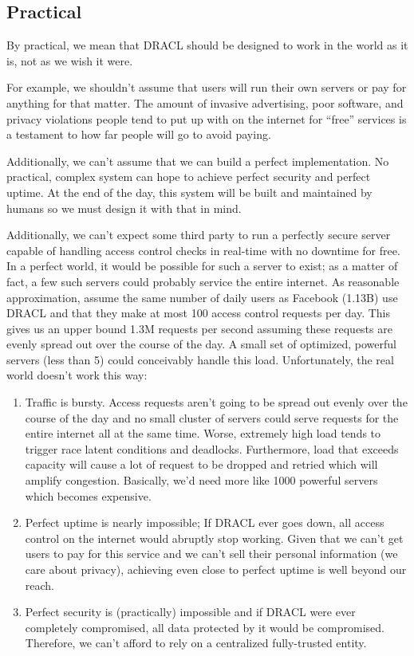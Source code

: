 \documentclass[pdftex,12pt,a4papaer]{report}
\begin{document}
\subsection{Practical}

By practical, we mean that DRACL should be designed to work in the world as it
is, not as we wish it were.

For example, we shouldn't assume that users will run their own servers or pay
for anything for that matter. The amount of invasive advertising, poor software,
and privacy violations people tend to put up with on the internet for ``free''
services is a testament to how far people will go to avoid paying.

Additionally, we can't assume that we can build a perfect implementation.
No practical, complex system can hope to achieve perfect security and perfect
uptime. At the end of the day, this system will be built and maintained by
humans so we must design it with that in mind.


Additionally, we can't expect some third party to run a perfectly secure server
capable of handling access control checks in real-time with no downtime for
free. In a perfect world, it would be possible for such a server to exist; as a
matter of fact, a few such servers could probably service the entire internet.
As reasonable approximation, assume the same number of daily users as
Facebook\texttrademark{} (1.13B) use DRACL and that they make at most 100 access
control requests per day. This gives us an upper bound 1.3M requests per second
assuming these requests are evenly spread out over the course of the day. A
small set of optimized, powerful servers (less than 5) could conceivably handle
this load. Unfortunately, the real world doesn't work this way:

\begin{enumerate}
\item Traffic is bursty. Access requests aren't going to be spread out evenly
  over the course of the day and no small cluster of servers could serve requests
  for the entire internet all at the same time. Worse, extremely high load tends
  to trigger race latent conditions and deadlocks. Furthermore, load that
  exceeds capacity will cause a lot of request to be dropped and retried which
  will amplify congestion. Basically, we'd need more like 1000 powerful servers
  which becomes expensive.
\item Perfect uptime is nearly impossible; If DRACL ever goes down, all access control on the internet
  would abruptly stop working. Given that we can't get users to pay for this
  service and we can't sell their personal information (we care about privacy),
  achieving even close to perfect uptime is well beyond our reach.
\item Perfect security is (practically) impossible and if DRACL were ever
  completely compromised, all data protected by it would be compromised. Therefore, we can't afford to rely on a
  centralized fully-trusted entity.
\end{enumerate}
\end{document}
